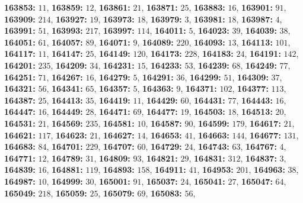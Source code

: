 \textsf{\bfseries 163853:} $11$, \textsf{\bfseries 163859:} $12$, \textsf{\bfseries 163861:} $21$, \textsf{\bfseries 163871:} $25$, \textsf{\bfseries 163883:} $16$, \textsf{\bfseries 163901:} $91$, \textsf{\bfseries 163909:} $214$, \textsf{\bfseries 163927:} $19$, \textsf{\bfseries 163973:} $18$, \textsf{\bfseries 163979:} $3$, \textsf{\bfseries 163981:} $18$, \textsf{\bfseries 163987:} $4$, \textsf{\bfseries 163991:} $51$, \textsf{\bfseries 163993:} $217$, \textsf{\bfseries 163997:} $114$, \textsf{\bfseries 164011:} $5$, \textsf{\bfseries 164023:} $39$, \textsf{\bfseries 164039:} $38$, \textsf{\bfseries 164051:} $61$, \textsf{\bfseries 164057:} $89$, \textsf{\bfseries 164071:} $9$, \textsf{\bfseries 164089:} $220$, \textsf{\bfseries 164093:} $13$, \textsf{\bfseries 164113:} $101$, \textsf{\bfseries 164117:} $11$, \textsf{\bfseries 164147:} $25$, \textsf{\bfseries 164149:} $120$, \textsf{\bfseries 164173:} $228$, \textsf{\bfseries 164183:} $24$, \textsf{\bfseries 164191:} $142$, \textsf{\bfseries 164201:} $235$, \textsf{\bfseries 164209:} $34$, \textsf{\bfseries 164231:} $15$, \textsf{\bfseries 164233:} $53$, \textsf{\bfseries 164239:} $68$, \textsf{\bfseries 164249:} $77$, \textsf{\bfseries 164251:} $71$, \textsf{\bfseries 164267:} $16$, \textsf{\bfseries 164279:} $5$, \textsf{\bfseries 164291:} $36$, \textsf{\bfseries 164299:} $51$, \textsf{\bfseries 164309:} $37$, \textsf{\bfseries 164321:} $56$, \textsf{\bfseries 164341:} $65$, \textsf{\bfseries 164357:} $5$, \textsf{\bfseries 164363:} $9$, \textsf{\bfseries 164371:} $102$, \textsf{\bfseries 164377:} $113$, \textsf{\bfseries 164387:} $25$, \textsf{\bfseries 164413:} $35$, \textsf{\bfseries 164419:} $11$, \textsf{\bfseries 164429:} $60$, \textsf{\bfseries 164431:} $77$, \textsf{\bfseries 164443:} $16$, \textsf{\bfseries 164447:} $16$, \textsf{\bfseries 164449:} $28$, \textsf{\bfseries 164471:} $69$, \textsf{\bfseries 164477:} $19$, \textsf{\bfseries 164503:} $18$, \textsf{\bfseries 164513:} $20$, \textsf{\bfseries 164531:} $21$, \textsf{\bfseries 164569:} $235$, \textsf{\bfseries 164581:} $10$, \textsf{\bfseries 164587:} $90$, \textsf{\bfseries 164599:} $179$, \textsf{\bfseries 164617:} $21$, \textsf{\bfseries 164621:} $117$, \textsf{\bfseries 164623:} $21$, \textsf{\bfseries 164627:} $14$, \textsf{\bfseries 164653:} $41$, \textsf{\bfseries 164663:} $144$, \textsf{\bfseries 164677:} $131$, \textsf{\bfseries 164683:} $84$, \textsf{\bfseries 164701:} $229$, \textsf{\bfseries 164707:} $60$, \textsf{\bfseries 164729:} $24$, \textsf{\bfseries 164743:} $63$, \textsf{\bfseries 164767:} $4$, \textsf{\bfseries 164771:} $12$, \textsf{\bfseries 164789:} $31$, \textsf{\bfseries 164809:} $93$, \textsf{\bfseries 164821:} $29$, \textsf{\bfseries 164831:} $312$, \textsf{\bfseries 164837:} $3$, \textsf{\bfseries 164839:} $16$, \textsf{\bfseries 164881:} $119$, \textsf{\bfseries 164893:} $158$, \textsf{\bfseries 164911:} $41$, \textsf{\bfseries 164953:} $201$, \textsf{\bfseries 164963:} $38$, \textsf{\bfseries 164987:} $10$, \textsf{\bfseries 164999:} $30$, \textsf{\bfseries 165001:} $91$, \textsf{\bfseries 165037:} $24$, \textsf{\bfseries 165041:} $27$, \textsf{\bfseries 165047:} $64$, \textsf{\bfseries 165049:} $218$, \textsf{\bfseries 165059:} $25$, \textsf{\bfseries 165079:} $69$, \textsf{\bfseries 165083:} $56$, 
